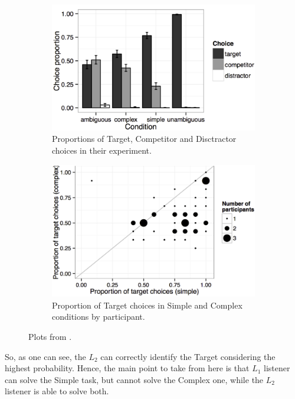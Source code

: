 \begin{figure}
\centering
\begin{subfigure}{.5\textwidth}
  \centering
  \includegraphics[width=1\linewidth]{images/trials_stats.png}
  \caption{Proportions of Target, Competitor and Disctractor choices in their experiment. }
  \label{fig:trial_stats}
\end{subfigure}%
\begin{subfigure}{.5\textwidth}
  \centering
  \includegraphics[width=1\linewidth]{images/l1_l2_stats.png}
  \caption{Proportion of Target choices in Simple and Complex conditions by participant. }
  \label{fig:prob_stats}
\end{subfigure}
\caption{Plots from \cite{Franke_2016}.}
\label{fig:stats}
\end{figure}

So, as one can see, the $L_2$ can correctly identify the Target considering the highest probability. Hence, the main point to take from here is that $L_1$ listener can solve the Simple task, but cannot solve the Complex one, while the $L_2$ listener is able to solve both. 

